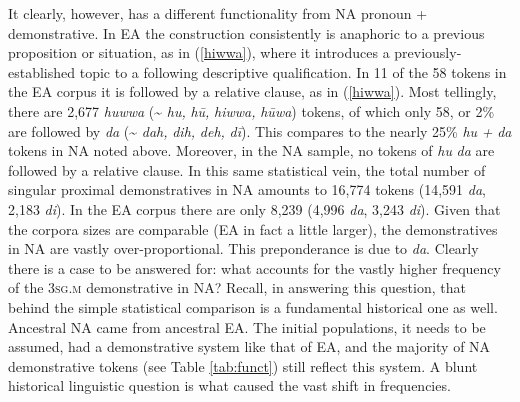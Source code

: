 \documentclass[output=paper]{langsci/langscibook}
\begin{document}
It clearly, however, has a different functionality from NA pronoun + demonstrative. In EA the construction consistently is anaphoric to a previous proposition or situation, as in (\ref{hiwwa}), where it introduces a previously-established topic to a following descriptive qualification. In 11 of the 58 tokens in the EA corpus it is followed by a relative clause, as in (\ref{hiwwa}). Most tellingly, there are 2,677 \textit{huwwa} ({\textasciitilde} \textit{hu,} \textit{hū,} \textit{hiwwa,} \textit{hūwa}) tokens, of which only 58, or 2\% are followed by \textit{da} ({\textasciitilde} \textit{dah,} \textit{dih,} \textit{deh,} \textit{dī}). This compares to the nearly 25\% \textit{hu} \textit{+} \textit{da} tokens in NA noted above. Moreover, in the NA sample, no tokens of \textit{hu} \textit{da} are followed by a relative clause. In this same statistical vein, the total number of singular proximal demonstratives in NA amounts to 16,774 tokens (14,591 \textit{da}, 2,183 \textit{di}). In the EA corpus there are only 8,239 (4,996 \textit{da}, 3,243 \textit{di}). Given that the corpora sizes are comparable (EA in fact a little larger), the demonstratives in NA are vastly over-proportional. This preponderance is due to \textit{da}. Clearly there is a case to be answered for: what accounts for the vastly higher frequency of the 3\textsc{sg.m} demonstrative in NA? Recall, in answering this question, that behind the simple statistical comparison is a fundamental historical one as well. Ancestral NA came from ancestral EA. The initial populations, it needs to be assumed, had a demonstrative system like that of EA, and the majority of NA demonstrative tokens (see Table \ref{tab:funct}) still reflect this system. A blunt historical linguistic question is what caused the vast shift in frequencies.
\end{document}
